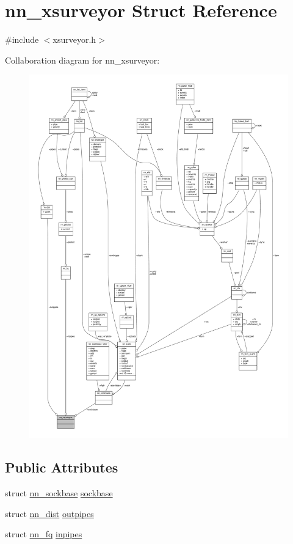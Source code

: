 \hypertarget{structnn__xsurveyor}{}\section{nn\+\_\+xsurveyor Struct Reference}
\label{structnn__xsurveyor}


{\ttfamily \#include $<$xsurveyor.\+h$>$}



Collaboration diagram for nn\+\_\+xsurveyor\+:\nopagebreak
\begin{figure}[H]
\begin{center}
\leavevmode
\includegraphics[width=350pt]{structnn__xsurveyor__coll__graph}
\end{center}
\end{figure}
\subsection*{Public Attributes}
\begin{DoxyCompactItemize}
\item 
struct \hyperlink{structnn__sockbase}{nn\+\_\+sockbase} \hyperlink{structnn__xsurveyor_a74031df742a38c6180ff842bf50be7ba}{sockbase}
\item 
struct \hyperlink{structnn__dist}{nn\+\_\+dist} \hyperlink{structnn__xsurveyor_af4b29b3a1eff8803e7476ffe26fbdd65}{outpipes}
\item 
struct \hyperlink{structnn__fq}{nn\+\_\+fq} \hyperlink{structnn__xsurveyor_a22880899a5fc576ce14d537d72010317}{inpipes}
\end{DoxyCompactItemize}


